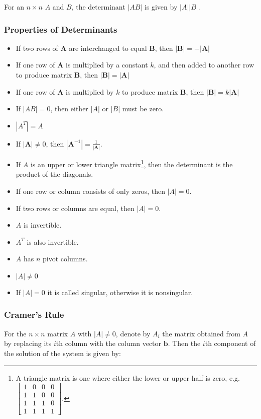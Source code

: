 \documentclass[12pt,landscape,twocolumn]{article}
\newcommand{\ma}[0]{\mathbf{A} }        %
\newcommand{\mb}[0]{\mathbf{B} }        %
\begin{document}
        For an $n \times n$ $A$ and $B$, the determinant $|AB|$ is given by $|A||B|$.

        \subsubsection{Properties of Determinants}
        \begin{itemize}
        \item If two rows of $\ma$ are interchanged to equal $\mb$, then
            $ | \mb | = - | \ma | $
        \item If one row of $\ma$ is multiplied by a constant $k$, and then added to another row to produce matrix $\mb$, then
            $ | \mb | = | \ma | $
        \item If one row of $\ma$ is multiplied by $k$ to produce matrix $\mb$, then
            $ | \mb | = k | \ma | $
        \item If $|AB| = 0$, then either $|A|$ or $|B|$ must be zero.
        \item $|A^T| = A$
        \item If $| \ma | \neq 0$, then $| \ma^{-1} | = \frac{1}{|\ma |}$.
        \item If $A$ is an upper or lower triangle matrix\footnote{A triangle matrix is one where either the lower or upper half is zero, e.g. $\left[\begin{array}{cccc}1 & 0 & 0 & 0\\1 & 1 & 0 & 0\\1 & 1 & 1 & 0\\1 & 1 & 1 & 1\end{array}\right]$.}, then the determinant is the product of the diagonals.
        \item If one row or column consists of only zeros, then $|A| = 0$.
        \item If two rows or columns are equal, then $|A|=0$.
        \item $A$ is invertible.
        \item $A^T$ is also invertible.
        \item $A$ has $n$ pivot columns.
        \item $|A| \neq 0$
        \item If $|A| = 0$ it is called singular, otherwise it is nonsingular.
        \end{itemize}

        \subsubsection{Cramer's Rule}
        For the $n \times n$ matrix $A$ with $|A| \neq 0$, denote by $A_i$ the matrix obtained from $A$ by replacing its $i$th column with the column vector $\mathbf{b}$. Then the $i$th component of the solution of the system is given by:
\end{document}
